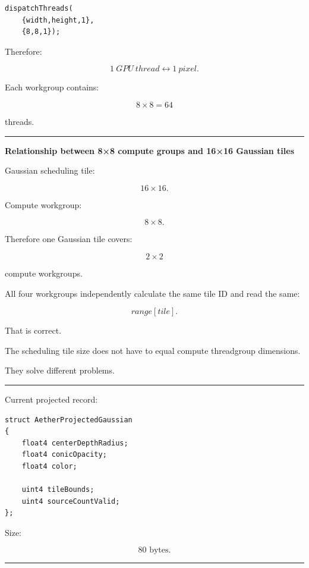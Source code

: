 \begin{verbatim}
dispatchThreads(
    {width,height,1},
    {8,8,1});
\end{verbatim}

Therefore:

\[
\boxed{
1\ GPU\ thread
\leftrightarrow
1\ pixel.
}
\]

Each workgroup contains:

\[
8\times8=64
\]

threads.

\begin{center}\rule{0.5\linewidth}{0.5pt}\end{center}

\textbf{Relationship between 8×8 compute groups and 16×16 Gaussian tiles}

Gaussian scheduling tile:

\[
16\times16.
\]

Compute workgroup:

\[
8\times8.
\]

Therefore one Gaussian tile covers:

\[
2\times2
\]

compute workgroups.

All four workgroups independently calculate the same tile ID and read the same:

\[
range[tile].
\]

That is correct.

The scheduling tile size does not have to equal compute threadgroup dimensions.

They solve different problems.

\begin{center}\rule{0.5\linewidth}{0.5pt}\end{center}

Current projected record:

\protect{}\label{2lb4al}%
\begin{verbatim}
struct AetherProjectedGaussian
{
    float4 centerDepthRadius;
    float4 conicOpacity;
    float4 color;

    uint4 tileBounds;
    uint4 sourceCountValid;
};
\end{verbatim}

Size:

\[
\boxed{80\text{ bytes}.}
\]

\begin{center}\rule{0.5\linewidth}{0.5pt}\end{center}

